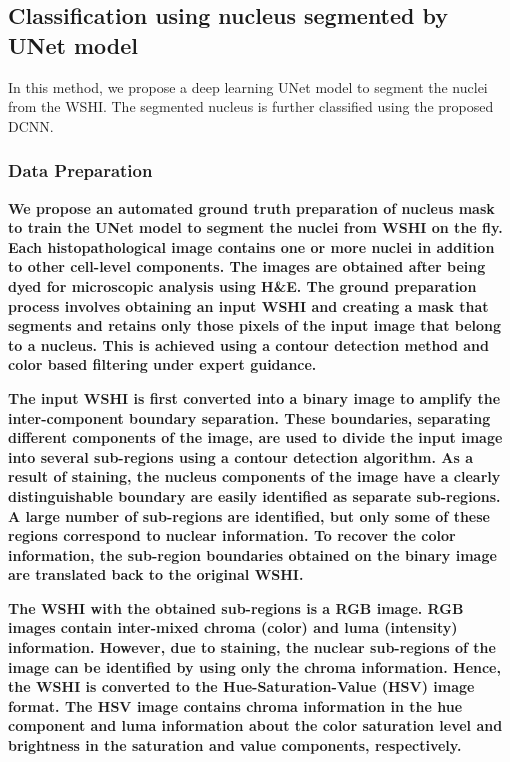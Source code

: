 \documentclass[conference]{IEEEtran}
\begin{document}
\subsection{Classification using nucleus segmented by UNet model}

In this method, we propose a deep learning UNet model to segment the nuclei from the WSHI. The segmented nucleus is further classified using the proposed DCNN.

\subsubsection{Data Preparation}
\textbf{
We propose an automated ground truth preparation of nucleus mask to train the UNet model to segment the nuclei from WSHI on the fly. Each histopathological image contains one or more nuclei in addition to other cell-level components. The images are obtained after being dyed for microscopic analysis using H&E. The  ground preparation process involves obtaining an input WSHI and creating a mask that segments and retains only those pixels of the input image that belong to a nucleus. This is achieved using a contour detection method and color based filtering under expert guidance.}

\textbf{
The input WSHI is first converted into a binary image to amplify the inter-component boundary separation. These boundaries, separating different components of the image, are used to divide the input image into several sub-regions using a contour detection algorithm. As a result of staining, the nucleus components of the image have a clearly distinguishable boundary are easily identified as separate sub-regions. A large number of sub-regions are identified, but only some of these regions correspond to nuclear information. To recover the color information, the sub-region boundaries obtained on the binary image are translated back to the original WSHI. 
}

\textbf{
The WSHI with the obtained sub-regions is a RGB image. RGB images contain inter-mixed chroma (color) and luma (intensity) information. However, due to staining, the nuclear sub-regions of the image can be identified by using only the chroma information. Hence, the WSHI is converted to the Hue-Saturation-Value (HSV) image format. The HSV image contains chroma information in the hue component and luma information about the color saturation level and brightness in the saturation and value components, respectively.
}
\end{document}
